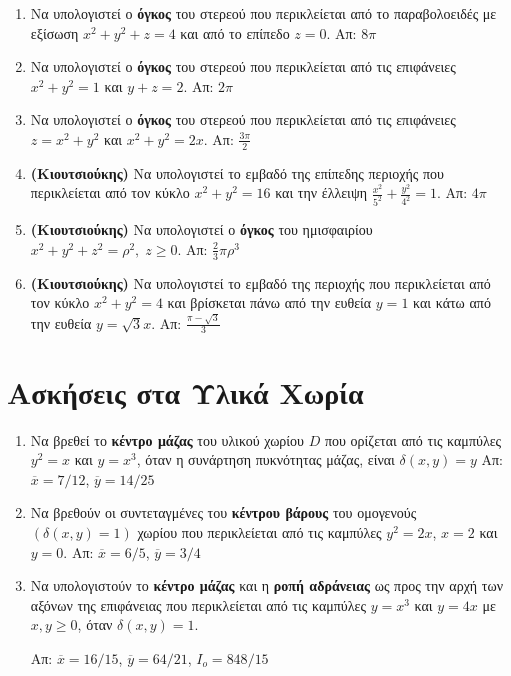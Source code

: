 \documentclass[a4paper,table]{report}
\begin{document}
\begin{enumerate}
  \item Να υπολογιστεί ο \textbf{όγκος} του στερεού που περικλείεται από το 
    παραβολοειδές με εξίσωση $ x^{2}+y^{2}+z=4 $ και από το επίπεδο $ z=0 $.
    \hfill Απ: $ 8\pi $ 

  \item Να υπολογιστεί ο \textbf{όγκος} του στερεού που περικλείεται από τις 
    επιφάνειες $ x^{2}+y^{2}=1 $ και $ y+z=2 $.
    \hfill Απ: $ 2 \pi $ 

  \item Να υπολογιστεί ο \textbf{όγκος} του στερεού που περικλείεται από τις 
    επιφάνειες $ z=x^{2}+y^{2} $ και $ x^{2}+y^{2}=2x $.
    \hfill Απ: $ \frac{3 \pi}{2} $ 

  \item \label{ask:area} 
    \textbf{(Κιουτσιούκης)} Να υπολογιστεί το εμβαδό της επίπεδης περιοχής που 
    περικλείεται από τον κύκλο $ x^{2}+y^{2} = 16 $ και την έλλειψη 
    $ \frac{x^{2}}{5^{2}} + \frac{y^{2}}{4^{2}} =1$. 
    \hfill Απ: $ 4 \pi $ 

  \item \textbf{(Κιουτσιούκης)} Να υπολογιστεί ο 
    \textbf{όγκος} του ημισφαιρίου $ x^{2}+y^{2}+z^{2}=\rho^{2}, \; z \geq 0 $.
    \hfill Απ: $ \frac{2}{3} \pi \rho^{3} $ 

  \item \textbf{(Κιουτσιούκης)} Να υπολογιστεί το εμβαδό της περιοχής που περικλείεται 
    από τον κύκλο $ x^{2}+y^{2}=4 $ και βρίσκεται πάνω από την ευθεία $ y=1 $ και κάτω 
    από την ευθεία $ y= \sqrt{3} x $.
    \hfill Απ: $ \frac{\pi - \sqrt{3}}{3} $ 
\end{enumerate}



\section*{Ασκήσεις στα Υλικά Χωρία}


\begin{enumerate}
  \item Να βρεθεί το \textbf{κέντρο μάζας} του υλικού χωρίου $D$ που ορίζεται από τις 
    καμπύλες $y^{2}=x$ και $y=x^{3}$, όταν η συνάρτηση πυκνότητας μάζας, είναι 
    $\delta(x,y)=y$
  \hfill Απ: $\overline{x}={7}/{12}$, $\overline{y}={14}/{25}$

\item Να βρεθούν οι συντεταγμένες του \textbf{κέντρου βάρους} του ομογενούς 
  $(\delta(x,y)=1)$ χωρίου που περικλείεται από τις καμπύλες $y^{2}=2x$, $x=2$ και $y=0$.
  \hfill Απ: $\overline{x}={6}/{5}$, $\overline{y}={3}/{4}$

\item  Να υπολογιστούν το \textbf{κέντρο μάζας} και η \textbf{ροπή αδράνειας} ως προς 
  την αρχή των αξόνων της επιφάνειας που περικλείεται από τις καμπύλες $y=x^{3}$ και  
  $y=4x$ με $x,y\geq 0$, όταν $\delta(x,y)=1$.

  \hfill Απ: $\overline{x}={16}/{15}$, $\overline{y}={64}/{21}$, 
  $I_{o}={848}/{15}$
\end{enumerate}
\end{document}
